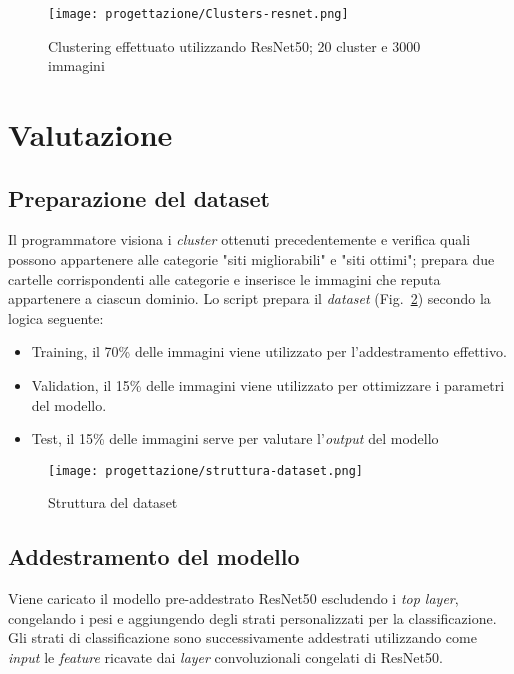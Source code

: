 \begin{figure}[!h] 
  \centering 
  \texttt{[image: progettazione/Clusters-resnet.png]} 
  \caption{Clustering effettuato utilizzando ResNet50; 20 cluster e 3000 immagini}
  \label{fig:clusters-resnet}
\end{figure}



\newpage

\section{Valutazione}

\subsection{Preparazione del dataset}
Il programmatore visiona i \emph{cluster} ottenuti precedentemente e verifica quali possono appartenere alle categorie "siti migliorabili" e "siti ottimi"; prepara due cartelle corrispondenti alle categorie e inserisce le immagini che reputa appartenere a ciascun dominio.
Lo script prepara il \emph{dataset} (Fig.~\ref{fig:struttura-dataset}) secondo la logica seguente:
\begin{itemize}
  \item Training, il 70\% delle immagini viene utilizzato per l'addestramento effettivo.
  \item Validation, il 15\% delle immagini viene utilizzato per ottimizzare i parametri del modello.
  \item Test, il 15\% delle immagini serve per valutare l'\emph{output} del modello
\end{itemize}

\begin{figure}[!h] 
  \centering 
  \texttt{[image: progettazione/struttura-dataset.png]} 
  \caption{Struttura del dataset}
  \label{fig:struttura-dataset}
\end{figure}

\subsection{Addestramento del modello}
Viene caricato il modello pre-addestrato ResNet50 escludendo i \emph{top layer}, congelando i pesi e aggiungendo degli strati personalizzati per la classificazione.
Gli strati di classificazione sono successivamente addestrati utilizzando come \emph{input} le \emph{feature} ricavate dai \emph{layer} convoluzionali congelati di ResNet50. 

